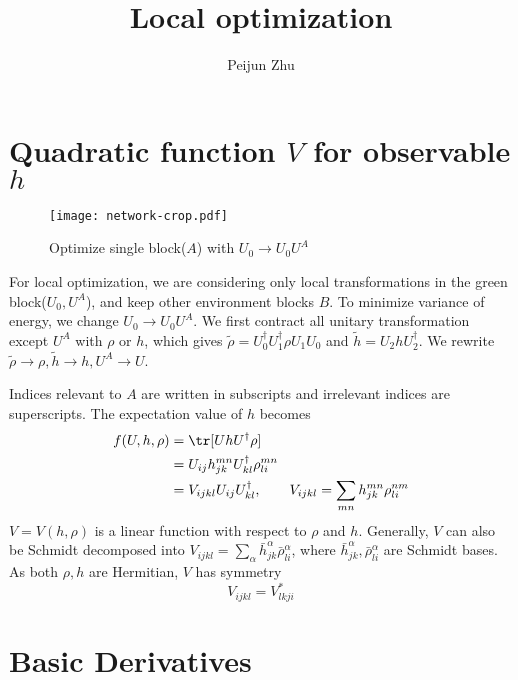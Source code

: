 \documentclass{article}
\title{Local optimization}
\author{Peijun Zhu}
\begin{document}
\maketitle
\section{Quadratic function $V$ for observable $h$}
\begin{figure}[htb]
	\centering
	\texttt{[image: network-crop.pdf]}
	\caption{Optimize single block($A$) with $U_0\rightarrow U_0U^A$}
\end{figure} 
For local optimization, we are considering only local transformations in the green block({\color{ForestGreen}$U_0, U^A$}), and keep other environment blocks {\color{blue}$B$}. To minimize variance of energy, we change $U_0\rightarrow U_0U^A$. We first contract all unitary transformation except $U^A$ with $\rho$ or $h$, which gives $\tilde \rho=U_0^\dagger U_1^\dagger\rho U_1 U_0$ and $\tilde h=U_2h U_2^\dagger$. We rewrite $\tilde\rho\rightarrow\rho, \tilde h\rightarrow h,U^A\rightarrow U$.

Indices relevant to $A$ are written in subscripts and irrelevant indices are superscripts. The expectation value of $h$ becomes
\begin{align}
f(U, h, \rho)&=\tr[U h U^{\dagger} \rho]\\
 &=U_{ij} h_{jk}^{mn}U^{\dagger}_{kl} \rho_{li}^{mn}\\
 &= V_{ijkl}U_{ij}U^{\dagger}_{kl}, \qquad V_{ijkl}=\sum_{mn}  h_{jk}^{mn}  \rho_{li}^{nm}
\end{align}
$V=V(h, \rho)$ is a linear function with respect to $\rho$ and $h$. Generally, $V$ can also be Schmidt decomposed into $V_{ijkl}=\sum_\alpha \bar h_{jk}^\alpha \bar \rho_{li}^\alpha$, where $\bar h_{jk}^\alpha, \bar \rho_{li}^\alpha$ are Schmidt bases. As both $\rho,  h$ are Hermitian, $V$ has symmetry
\begin{equation}
	V_{ijkl}=V_{lkji}^*\label{sym}
\end{equation}


\section{Basic Derivatives}
\end{document}

